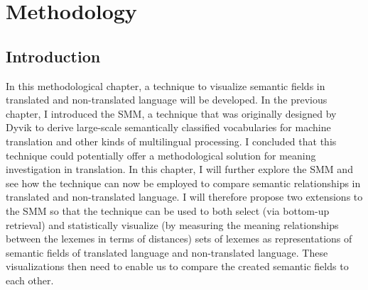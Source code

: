 \chapter{Methodology}
\hypertarget{Chapter3Methodology}{}\section{\label{sec:3.1}  Introduction}

In this methodological chapter, a technique to visualize semantic fields in translated and non-translated language will be developed. In the previous chapter, I introduced the SMM, a technique that was originally designed by Dyvik to derive large-scale semantically classified vocabularies for machine translation and other kinds of multilingual processing. I concluded that this technique could potentially offer a methodological solution for meaning investigation in translation. In this chapter, I will further explore the SMM and see how the technique can now be employed to compare semantic relationships in translated and non-translated language. I will therefore propose two extensions to the SMM so that the technique can be used to both select (via bottom-up retrieval) and statistically visualize (by measuring the meaning relationships between the lexemes in terms of distances) sets of lexemes as representations of semantic fields of translated language and non-translated language. These visualizations then need to enable us to compare the created semantic fields to each other.




